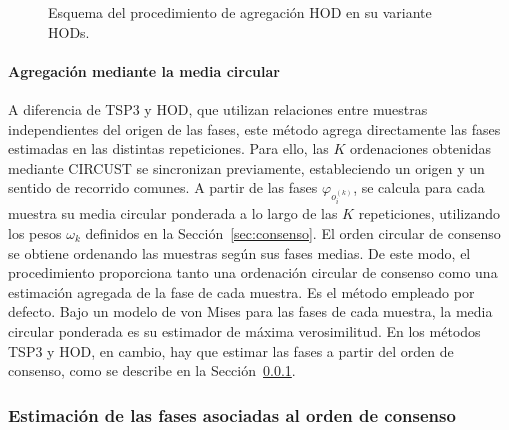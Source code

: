 \documentclass[12pt, a4paper]{report}
\begin{document}
\begin{figure}[!ht]
\caption{Esquema del procedimiento de agregación HOD en su variante HODs.}
\label{fig:hod}
\end{figure}

\paragraph{Agregación mediante la media circular}
\label{sec:agr-media}

A diferencia de TSP3 y HOD, que utilizan relaciones entre muestras independientes del origen de las fases, este método agrega directamente las fases estimadas en las distintas repeticiones. Para ello, las \(K\) ordenaciones obtenidas mediante CIRCUST se sincronizan previamente, estableciendo un origen y un sentido de recorrido comunes. A partir de las fases \(\varphi_{o_i^{(k)}}\), se calcula para cada muestra su media circular ponderada a lo largo de las \(K\) repeticiones, utilizando los pesos \(\omega_k\) definidos en la Sección~\ref{sec:consenso}. El orden circular de consenso se obtiene ordenando las muestras según sus fases medias. De este modo, el procedimiento proporciona tanto una ordenación circular de consenso como una estimación agregada de la fase de cada muestra. Es el método empleado por defecto. Bajo un modelo de von Mises para las fases de cada muestra, la media circular ponderada es su estimador de máxima verosimilitud. En los métodos TSP3 y HOD, en cambio, hay que estimar las fases a partir del orden de consenso, como se describe en la Sección~\ref{sec:EscalaConsenso}.

\subsubsection{Estimación de las fases asociadas al orden de consenso}
\label{sec:EscalaConsenso}
\end{document}
